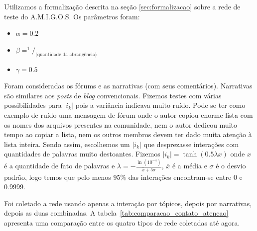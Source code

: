 \documentclass{article}
\begin{document}
\begin{table}[htbp]
	\begin{boxedminipage}{\textwidth}
		Utilizamos a formalização descrita na seção \ref{sec:formalizacao} sobre a
		rede de teste do A.M.I.G.O.S. Os parâmetros foram:
		\begin{itemize}
		  \item $\alpha = 0.2$
		  \item $\beta = ^1/_\text{(quantidade da abrangência)}$
		  \item $\gamma = 0.5$
		\end{itemize}
		Foram consideradas os fórums e as narrativas (com seus comentários).
		Narrativas são similares aos \textit{posts} de \textit{blog} convencionais.
		Fizemos testes com várias possibilidades para $|i_k|$ pois a variância
		indicava muito ruído. Pode se ter como exemplo de ruído uma mensagem de
		fórum onde o autor copiou enorme lista com os nomes dos arquivos presentes na
		comunidade, nem o autor dedicou muito tempo ao copiar a lista, nem os outros
		membros devem ter dado muita atenção à lista inteira. Sendo assim, escolhemos
		um $|i_k|$ que desprezasse interações com quantidades de palavras muito
		destoantes. Fizemos $|i_k|=\tanh(0.5\lambda x)$ onde $x$ é a quantidade de
		fato de palavras e $\lambda=-\frac{\ln(10^{-4})}{\overline{x} + 5\sigma}$,
		$\overline{x}$ é a média e $\sigma$ é o desvio padrão, logo temos que pelo
		menos 95\% das interações encontram-se entre 0 e 0.9999.
		
		Foi coletado a rede usando apenas a interação por tópicos, depois por
		narrativas, depois as duas combinadas. A
		tabela~\ref{tab:comparacao_contato_atencao} apresenta uma comparação entre os
		quatro tipos de rede coletadas até agora.
		

\end{boxedminipage}
\end{table}
\end{document}
